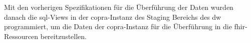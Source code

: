 Mit den vorherigen Spezifikationen für die Überführung der Daten wurden danach die \ac{sql}-Views in der \ac{copra}-Instanz des Staging Bereichs des \ac{dw} programmiert, um die Daten der \ac{copra}-Instanz für die Überführung in die \ac{fhir}-Ressourcen bereitzustellen.

